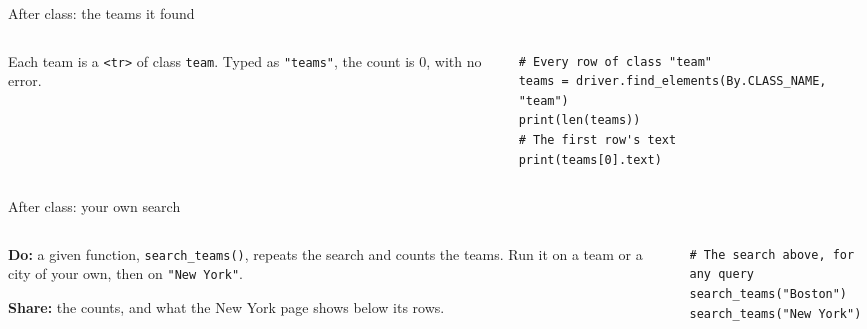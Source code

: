 \documentclass[9pt,aspectratio=169]{beamer}
\begin{document}
\begin{frame}[fragile]{After class: the teams it found}
    \begin{columns}[T]
        \begin{column}{0.37\textwidth}
            Each team is a \texttt{<tr>} of class \texttt{team}. Typed as \texttt{"teams"}, the count is 0, with no error.
        \end{column}
        \begin{column}{0.6\textwidth}
\begin{lstlisting}[style=lab]
# Every row of class "team"
teams = driver.find_elements(By.CLASS_NAME, "team")
print(len(teams))
# The first row's text
print(teams[0].text)
\end{lstlisting}
        \end{column}
    \end{columns}
\end{frame}

\begin{frame}[fragile]{After class: your own search}
    \begin{columns}[T]
        \begin{column}{0.37\textwidth}
            \textbf{Do:} a given function, \texttt{search\_teams()}, repeats the search and counts the teams. Run it on a team or a city of your own, then on \texttt{"New York"}.

            \medskip
            \textbf{Share:} the counts, and what the New York page shows below its rows.
        \end{column}
        \begin{column}{0.6\textwidth}
\begin{lstlisting}[style=lab]
# The search above, for any query
search_teams("Boston")
search_teams("New York")
\end{lstlisting}
        \end{column}
    \end{columns}
\end{frame}
\end{document}
